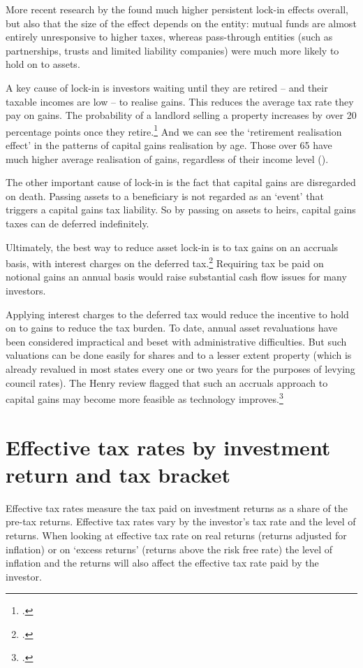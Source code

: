 \begin{subappendices}
More recent research by the \textcite{CBO2012CapitalGainsTaxElasticity} found much higher persistent lock-in effects overall, but also that the size of the effect depends on the entity: mutual funds are almost entirely unresponsive to higher taxes, whereas pass-through entities (such as partnerships, trusts and limited liability companies) were much more likely to hold on to assets.

A key cause of lock-in is investors waiting until they are retired – and their taxable incomes are low – to realise gains. This reduces the average tax rate they pay on gains. The probability of a landlord selling a property increases by over 20 percentage points once they retire.\footcite{WoodOng2010}  And we can see the ‘retirement realisation effect’ in the patterns of capital gains realisation by age. Those over 65 have much higher average realisation of gains, regardless of their income level (). 

The other important cause of lock-in is the fact that capital gains are disregarded on death. Passing assets to a beneficiary is not regarded as an ‘event’ that triggers a capital gains tax liability. So by passing on assets to heirs, capital gains taxes can de deferred indefinitely. 

Ultimately, the best way to reduce asset lock-in is to tax gains on an accruals basis, with interest charges on the deferred tax.\footcites[][11--14]{Burman2009}[][12]{Ingles2009a}  Requiring tax be paid on notional gains an annual basis would raise substantial cash flow issues for many investors. 

Applying interest charges to the deferred tax would reduce the incentive to hold on to gains to reduce the tax burden. To date, annual asset revaluations have been considered impractical and beset with administrative difficulties.  But such valuations can be done easily for shares and to a lesser extent property (which is already revalued in most states every one or two years for the purposes of levying council rates).  The Henry review flagged that such an accruals approach to capital gains may become more feasible as technology improves.\footcite[][64]{HenryTaxReview2010} 



\chapter{Effective tax rates by investment return and tax bracket}\label{appendix:EMTRs}
Effective tax rates measure the tax paid on investment returns as a share of the pre-tax returns. Effective tax rates vary by the investor’s tax rate and the level of returns. When looking at effective tax rate on real returns (returns adjusted for inflation) or on `excess returns' (returns above the risk free rate) the level of inflation and the returns will also affect the effective tax rate paid by the investor. 


\end{subappendices}
